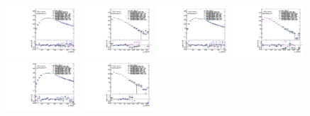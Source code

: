 \begin{figure}[htbp!]
\begin{center}
\includegraphics[angle=270, width=0.24\textwidth]{./figures/boosted/AppendixReweight/Compare/Data_TwoTag_split_Sideband_directcompare_leadHCand_trk0_Pt_1.pdf}
\includegraphics[angle=270, width=0.24\textwidth]{./figures/boosted/AppendixReweight/Compare/Data_TwoTag_split_Sideband_directcompare_leadHCand_trk1_Pt_1.pdf}
\includegraphics[angle=270, width=0.24\textwidth]{./figures/boosted/AppendixReweight/Compare/Data_TwoTag_split_Sideband_directcompare_sublHCand_trk0_Pt_1.pdf}
\includegraphics[angle=270, width=0.24\textwidth]{./figures/boosted/AppendixReweight/Compare/Data_TwoTag_split_Sideband_directcompare_sublHCand_trk1_Pt_1.pdf}\\
\includegraphics[angle=270, width=0.24\textwidth]{./figures/boosted/AppendixReweight/Compare/Data_TwoTag_split_Control_directcompare_leadHCand_trk0_Pt_1.pdf}
\includegraphics[angle=270, width=0.24\textwidth]{./figures/boosted/AppendixReweight/Compare/Data_TwoTag_split_Control_directcompare_leadHCand_trk1_Pt_1.pdf}

\end{center}
\end{figure}
